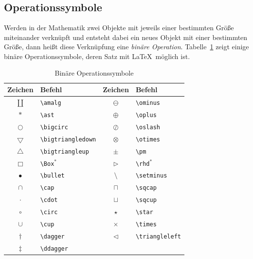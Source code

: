 \documentclass[a4paper,10pt,twoside]{scrbook}
\begin{document}
\subsection{Operationssymbole}


Werden in der Mathematik zwei Objekte mit jeweils einer bestimmten Größe 
miteinander verknüpft und entsteht dabei ein neues Objekt mit einer bestimmten Größe, dann heißt diese Verknüpfung 
eine \textsl{binäre Operation}. Tabelle~\ref{Tabelle_Binaere_Operationssymbole} zeigt einige 
binäre Operationssymbole, deren Satz mit \LaTeX\ möglich ist.


\begin{table}[h!tb]
\centering
\caption{Binäre Operationssymbole}
\label{Tabelle_Binaere_Operationssymbole}       %
\begin{tabular}{clcl}
\hline
Zeichen & Befehl & Zeichen & Befehl  \\
\hline
$\amalg$ & \texttt{\textbackslash amalg} &
$\ominus$ & \texttt{\textbackslash ominus} \\
$\ast$ & \texttt{\textbackslash ast} &
$\oplus$ & \texttt{\textbackslash oplus} \\
$\bigcirc$ & \texttt{\textbackslash bigcirc} &
$\oslash$ & \texttt{\textbackslash oslash} \\
$\bigtriangledown$ & \texttt{\textbackslash bigtriangledown} &
$\otimes$ & \texttt{\textbackslash otimes} \\
$\bigtriangleup$ & \texttt{\textbackslash bigtriangleup} &
$\pm$ & \texttt{\textbackslash pm} \\
$\Box$ & \texttt{\textbackslash Box$^\ast$} &
$\rhd$ & \texttt{\textbackslash rhd$^\ast$} \\
$\bullet$ & \texttt{\textbackslash bullet} &
$\setminus$ & \texttt{\textbackslash setminus} \\
$\cap$ & \texttt{\textbackslash cap} &
$\sqcap$ & \texttt{\textbackslash sqcap} \\
$\cdot$ & \texttt{\textbackslash cdot} &
$\sqcup$ & \texttt{\textbackslash sqcup} \\
$\circ$ & \texttt{\textbackslash circ} &
$\star$ & \texttt{\textbackslash star} \\
$\cup$ & \texttt{\textbackslash cup} &
$\times$ & \texttt{\textbackslash times} \\
$\dagger$ & \texttt{\textbackslash dagger} &
$\triangleleft$ & \texttt{\textbackslash triangleleft} \\
$\ddagger$ & \texttt{\textbackslash ddagger} &

\end{tabular}
\end{table}
\end{document}
